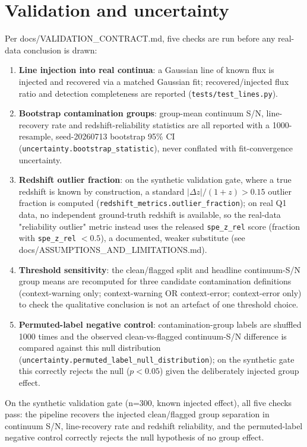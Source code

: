 \documentclass[11pt]{article}
\begin{document}
\section{Validation and uncertainty}
\label{sec:validation}
Per docs/VALIDATION\_CONTRACT.md, five checks are run before any real-data conclusion is drawn:
\begin{enumerate}
  \item \textbf{Line injection into real continua}: a Gaussian line of known flux is injected and
    recovered via a matched Gaussian fit; recovered/injected flux ratio and detection completeness are
    reported (\texttt{tests/test\_lines.py}).
  \item \textbf{Bootstrap contamination groups}: group-mean continuum S/N, line-recovery rate and
    redshift-reliability statistics are all reported with a 1000-resample, seed-20260713 bootstrap 95\%
    CI (\texttt{uncertainty.bootstrap\_statistic}), never conflated with fit-convergence uncertainty.
  \item \textbf{Redshift outlier fraction}: on the synthetic validation gate, where a true redshift is
    known by construction, a standard $|\Delta z|/(1+z) > 0.15$ outlier fraction is computed
    (\texttt{redshift\_metrics.outlier\_fraction}); on real Q1 data, no independent ground-truth redshift
    is available, so the real-data "reliability outlier" metric instead uses the released
    \texttt{spe\_z\_rel} score (fraction with \texttt{spe\_z\_rel} $<0.5$), a documented, weaker
    substitute (see docs/ASSUMPTIONS\_AND\_LIMITATIONS.md).
  \item \textbf{Threshold sensitivity}: the clean/flagged split and headline continuum-S/N group means are
    recomputed for three candidate contamination definitions (context-warning only; context-warning OR
    context-error; context-error only) to check the qualitative conclusion is not an artefact of one
    threshold choice.
  \item \textbf{Permuted-label negative control}: contamination-group labels are shuffled 1000 times and
    the observed clean-vs-flagged continuum-S/N difference is compared against this null distribution
    (\texttt{uncertainty.permuted\_label\_null\_distribution}); on the synthetic gate this correctly
    rejects the null ($p<0.05$) given the deliberately injected group effect.
\end{enumerate}
On the synthetic validation gate (n=300, known injected effect), all five checks pass: the pipeline
recovers the injected clean/flagged group separation in continuum S/N, line-recovery rate and redshift
reliability, and the permuted-label negative control correctly rejects the null hypothesis of no group
effect.
\end{document}
